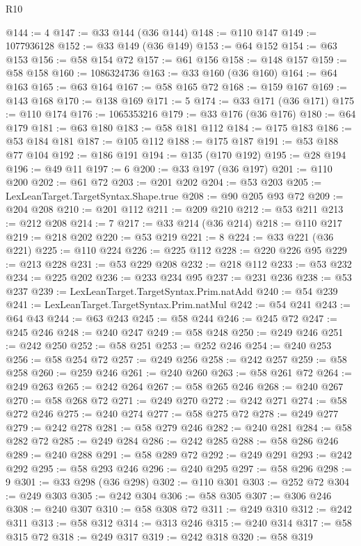 \begin{lexlean}{R10}
\begin{coremodule}
@144 := 4
@147 := @33 @144 (@36 @144)
@148 := @110 @147
@149 := 1077936128
@152 := @33 @149 (@36 @149)
@153 := @64 @152
@154 := @63 @153
@156 := @58 @154 @72
@157 := @61 @156
@158 := @148 @157
@159 := @58 @158
@160 := 1086324736
@163 := @33 @160 (@36 @160)
@164 := @64 @163
@165 := @63 @164
@167 := @58 @165 @72
@168 := @159 @167
@169 := @143 @168
@170 := @138 @169
@171 := 5
@174 := @33 @171 (@36 @171)
@175 := @110 @174
@176 := 1065353216
@179 := @33 @176 (@36 @176)
@180 := @64 @179
@181 := @63 @180
@183 := @58 @181 @112
@184 := @175 @183
@186 := @53 @184 @181
@187 := @105 @112
@188 := @175 @187
@191 := @53 @188 @77 @104
@192 := @186 @191
@194 := @135 (@170 @192)
@195 := @28 @194
@196 := @49 @11
@197 := 6
@200 := @33 @197 (@36 @197)
@201 := @110 @200
@202 := @61 @72
@203 := @201 @202
@204 := @53 @203
@205 := LexLeanTarget.TargetSyntax.Shape.true
@208 := @90 @205 @93 @72
@209 := @204 @208
@210 := @201 @112
@211 := @209 @210
@212 := @53 @211
@213 := @212 @208
@214 := 7
@217 := @33 @214 (@36 @214)
@218 := @110 @217
@219 := @218 @202
@220 := @53 @219
@221 := 8
@224 := @33 @221 (@36 @221)
@225 := @110 @224
@226 := @225 @112
@228 := @220 @226 @95
@229 := @213 @228
@231 := @53 @229 @208
@232 := @218 @112
@233 := @53 @232
@234 := @225 @202
@236 := @233 @234 @95
@237 := @231 @236
@238 := @53 @237
@239 := LexLeanTarget.TargetSyntax.Prim.natAdd
@240 := @54 @239
@241 := LexLeanTarget.TargetSyntax.Prim.natMul
@242 := @54 @241
@243 := @64 @43
@244 := @63 @243
@245 := @58 @244
@246 := @245 @72
@247 := @245 @246
@248 := @240 @247
@249 := @58 @248
@250 := @249 @246
@251 := @242 @250
@252 := @58 @251
@253 := @252 @246
@254 := @240 @253
@256 := @58 @254 @72
@257 := @249 @256
@258 := @242 @257
@259 := @58 @258
@260 := @259 @246
@261 := @240 @260
@263 := @58 @261 @72
@264 := @249 @263
@265 := @242 @264
@267 := @58 @265 @246
@268 := @240 @267
@270 := @58 @268 @72
@271 := @249 @270
@272 := @242 @271
@274 := @58 @272 @246
@275 := @240 @274
@277 := @58 @275 @72
@278 := @249 @277
@279 := @242 @278
@281 := @58 @279 @246
@282 := @240 @281
@284 := @58 @282 @72
@285 := @249 @284
@286 := @242 @285
@288 := @58 @286 @246
@289 := @240 @288
@291 := @58 @289 @72
@292 := @249 @291
@293 := @242 @292
@295 := @58 @293 @246
@296 := @240 @295
@297 := @58 @296
@298 := 9
@301 := @33 @298 (@36 @298)
@302 := @110 @301
@303 := @252 @72
@304 := @249 @303
@305 := @242 @304
@306 := @58 @305
@307 := @306 @246
@308 := @240 @307
@310 := @58 @308 @72
@311 := @249 @310
@312 := @242 @311
@313 := @58 @312
@314 := @313 @246
@315 := @240 @314
@317 := @58 @315 @72
@318 := @249 @317
@319 := @242 @318
@320 := @58 @319

\end{coremodule}
\end{lexlean}
